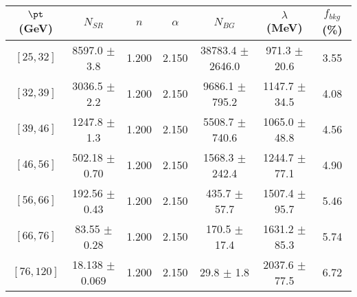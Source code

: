 \begin{tabular}{c||c|c|c|c|c||c}
$\pt$ (GeV) & $N_{SR}$ & $n$ & $\alpha$ & $N_{BG}$  & $\lambda$ (MeV) & $f_{bkg}$ (\%) \\
\hline
$[25, 32]$ & 8597.0 $\pm$ 3.8 & 1.200 & 2.150 & 38783.4 $\pm$ 2646.0 & 971.3 $\pm$ 20.6 & 3.55\\
$[32, 39]$ & 3036.5 $\pm$ 2.2 & 1.200 & 2.150 & 9686.1 $\pm$ 795.2 & 1147.7 $\pm$ 34.5 & 4.08\\
$[39, 46]$ & 1247.8 $\pm$ 1.3 & 1.200 & 2.150 & 5508.7 $\pm$ 740.6 & 1065.0 $\pm$ 48.8 & 4.56\\
$[46, 56]$ & 502.18 $\pm$ 0.70 & 1.200 & 2.150 & 1568.3 $\pm$ 242.4 & 1244.7 $\pm$ 77.1 & 4.90\\
$[56, 66]$ & 192.56 $\pm$ 0.43 & 1.200 & 2.150 & 435.7 $\pm$ 57.7 & 1507.4 $\pm$ 95.7 & 5.46\\
$[66, 76]$ & 83.55 $\pm$ 0.28 & 1.200 & 2.150 & 170.5 $\pm$ 17.4 & 1631.2 $\pm$ 85.3 & 5.74\\
$[76, 120]$ & 18.138 $\pm$ 0.069 & 1.200 & 2.150 & 29.8 $\pm$ 1.8 & 2037.6 $\pm$ 77.5 & 6.72\\
\end{tabular}
